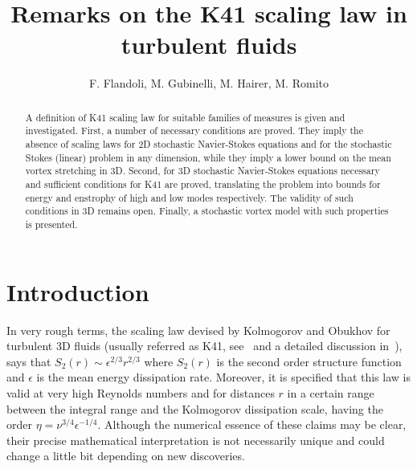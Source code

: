 \documentclass[11pt]{preprint}
\begin{document}

\date{} \title{Remarks on the K41 scaling law in turbulent fluids}
\author{F. Flandoli, M. Gubinelli, M. Hairer, M. Romito}
\titleindent=0.65cm

\maketitle \thispagestyle{empty}

\begin{abstract}
A definition of K41 scaling law for suitable families of measures is given and
investigated. First, a number of necessary conditions are proved. They imply
the absence of scaling laws for 2D stochastic Navier-Stokes equations and for
the stochastic Stokes (linear) problem in any dimension, while they imply a
lower bound on the mean vortex stretching in 3D. Second, for 3D stochastic
Navier-Stokes equations necessary and sufficient conditions for K41 are proved,
translating the problem into bounds for energy and enstrophy of high and low
modes respectively. The validity of such conditions in 3D remains open.
Finally, a stochastic vortex model with such properties is presented.
\end{abstract}



%

%

\section{Introduction}

In very rough terms, the scaling law devised by Kolmogorov and Obukhov for
turbulent 3D fluids (usually referred as K41, see~\cite{Kol} and a detailed
discussion in~\cite{Frisch}), says that $S_{2}\left(  r\right)  \sim\epsilon
^{2/3}r^{2/3}$ where $S_{2}\left(  r\right)  $ is the second order structure
function and $\epsilon$ is the mean energy dissipation rate. Moreover, it is
specified that this law is valid at very high Reynolds numbers and for
distances $r$ in a certain range between the integral range and the Kolmogorov
dissipation scale, having the order $\eta=\nu^{3/4}\epsilon^{-1/4} $. Although
the numerical essence of these claims may be clear, their precise mathematical
interpretation is not necessarily unique and could change a little bit
depending on new discoveries.
\end{document}
